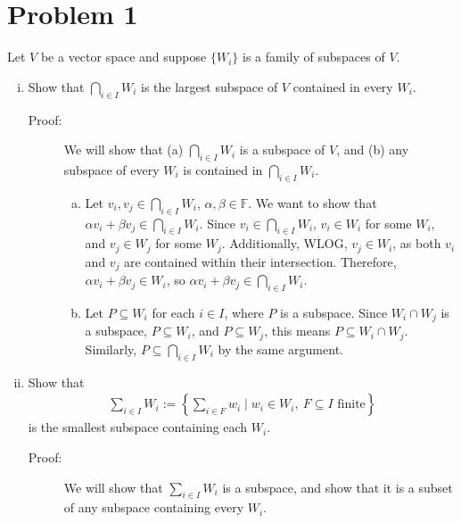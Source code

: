 \documentclass[10pt]{extarticle}
\title{}
\author{}
\date{}
\begin{document}
  \section{Problem 1}%
  Let $V$ be a vector space and suppose $\{W_i\}$ is a family of subspaces of $V$.
  \begin{enumerate}[(i)]
    \item Show that $\bigcap_{i\in I} W_i$ is the largest subspace of $V$ contained in every $W_i$.
    \begin{description}
      \item[Proof:] We will show that (a) $\bigcap_{i\in I} W_i$ is a subspace of $V$, and (b) any subspace of every $W_i$ is contained in $\bigcap_{i\in I} W_i$.
        \begin{enumerate}[(a)]
          \item Let $v_i, v_j\in \bigcap_{i\in I} W_i$, $\alpha,\beta \in \mathbb{F}$. We want to show that $\alpha v_i + \beta v_j \in \bigcap_{i\in I}W_i$. Since $v_i\in \bigcap_{i\in I}W_i$, $v_i \in W_i$ for some $W_i$, and $v_j\in W_j$ for some $W_j$. Additionally, WLOG, $v_j\in W_i$, as both $v_i$ and $v_j$ are contained within their intersection. Therefore, $\alpha v_i + \beta v_j\in W_i$, so $\alpha v_i + \beta v_j\in \bigcap_{i\in I}W_i$.
          \item Let $P\subseteq W_i$ for each $i\in I$, where $P$ is a subspace. Since $W_i \cap W_j$ is a subspace, $P\subseteq W_i$, and $P\subseteq W_j$, this means $P\subseteq W_i \cap W_j$. Similarly, $P\subseteq \bigcap_{i\in I}W_i$ by the same argument.
        \end{enumerate}
    \end{description}
    \item Show that
      \begin{align*}
        \sum_{i\in I}W_i := \left\{\sum_{i\in F}w_i \mid w_i\in W_i,~F\subseteq I \text{ finite}\right\}
      \end{align*}
      is the smallest subspace containing each $W_i$.
    \begin{description}
      \item[Proof:] We will show that $\sum_{i\in I}W_i$ is a subspace, and show that it is a subset of any subspace containing every $W_i$.\\


\end{description}
\end{enumerate}
\end{document}
